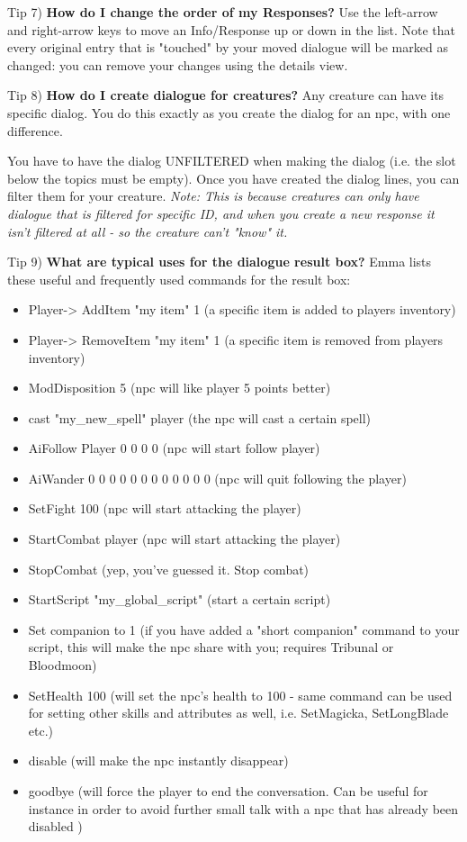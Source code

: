 Tip 7) \textbf{How do I change the order of my Responses?} Use the
left-arrow and right-arrow keys to move an Info/Response up or down in
the list. Note that every original entry that is "touched" by your moved
dialogue will be marked as changed: you can remove your changes using
the details view.

Tip 8) \textbf{How do I create dialogue for creatures?} Any creature can
have its specific dialog. You do this exactly as you create the dialog
for an npc, with one difference.

You have to have the dialog UNFILTERED when making the dialog (i.e. the
slot below the topics must be empty). Once you have created the dialog
lines, you can filter them for your creature. \emph{Note: This is
because creatures can only have dialogue that is filtered for specific
ID, and when you create a new response it isn't filtered at all - so the
creature can't "know" it.}

Tip 9) \textbf{What are typical uses for the dialogue result box?} Emma
lists these useful and frequently used commands for the result box:

\begin{itemize}
\item
  Player-> AddItem "my item" 1 (a specific item is added to
  players inventory)
\item
  Player-> RemoveItem "my item" 1 (a specific item is removed
  from players inventory)
\item
  ModDisposition 5 (npc will like player 5 points better)
\item
  cast "my\_new\_spell" player (the npc will cast a certain spell)
\item
  AiFollow Player 0 0 0 0 (npc will start follow player)
\item
  AiWander 0 0 0 0 0 0 0 0 0 0 0 0 (npc will quit following the player)
\item
  SetFight 100 (npc will start attacking the player)
\item
  StartCombat player (npc will start attacking the player)
\item
  StopCombat (yep, you've guessed it. Stop combat)
\item
  StartScript "my\_global\_script" (start a certain script)
\item
  Set companion to 1 (if you have added a "short companion" command to
  your script, this will make the npc share with you; requires Tribunal
  or Bloodmoon)
\item
  SetHealth 100 (will set the npc's health to 100 - same command can be
  used for setting other skills and attributes as well, i.e. SetMagicka,
  SetLongBlade etc.)
\item
  disable (will make the npc instantly disappear)
\item
  goodbye (will force the player to end the conversation. Can be useful
  for instance in order to avoid further small talk with a npc that has
  already been disabled )
\end{itemize}

